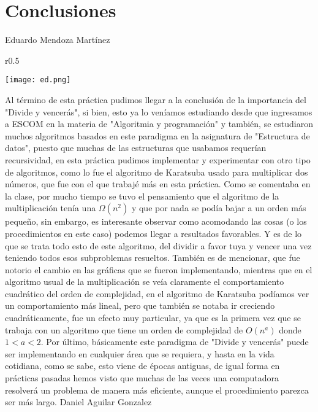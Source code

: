 \documentclass[12pt,twoside]{article}
\begin{document}
\section{Conclusiones}
Eduardo Mendoza Martínez\newline
\begin{wrapfigure}{r}{0.5\textwidth}
  \begin{center}
    \texttt{[image: ed.png]}
  \end{center}

\end{wrapfigure}
Al término de esta práctica pudimos llegar a la conclusión de la importancia del "Divide y vencerás", si bien, esto ya lo veníamos estudiando desde que ingresamos a ESCOM en la materia de "Algoritmia y programación" y también, se estudiaron muchos algoritmos basados en este paradigma en la asignatura de "Estructura de datos", puesto que muchas de las estructuras que usabamos requerían recursividad, en esta práctica pudimos implementar y experimentar con otro tipo de algoritmos, como lo fue el algoritmo de Karatsuba usado para multiplicar dos números, que fue con el que trabajé más en esta práctica. Como se comentaba en la clase, por mucho tiempo se tuvo el pensamiento que el algoritmo de la multiplicación tenía una $\Omega(n^2)$ y que por nada se podía bajar a un orden más pequeño, sin embargo, es interesante observar como acomodando las cosas (o los procedimientos en este caso) podemos llegar a resultados favorables. Y es de lo que se trata todo esto de este algoritmo, del dividir a favor tuya y vencer una vez teniendo todos esos subproblemas resueltos. También es de mencionar, que fue notorio el cambio en las gráficas que se fueron implementando, mientras que en el algoritmo usual de la multiplicación se veía claramente el comportamiento cuadrático del orden de complejidad, en el algoritmo de Karatsuba podíamos ver un comportamiento más lineal, pero que también se notaba ir creciendo cuadráticamente, fue un efecto muy particular, ya que es la primera vez que se trabaja con un algoritmo que tiene un orden de complejidad de $O(n^a)$ donde $1 < a < 2$. Por último, básicamente este paradigma de "Divide y vencerás" puede ser implementando en cualquier área que se requiera, y hasta en la vida cotidiana, como se sabe, esto viene de épocas antiguas, de igual forma en prácticas pasadas hemos visto que muchas de las veces una computadora resolverá un problema de manera más eficiente, aunque el procedimiento parezca ser más largo.
\newline \newline \newline \newline
Daniel Aguilar Gonzalez\newline
\end{document}
